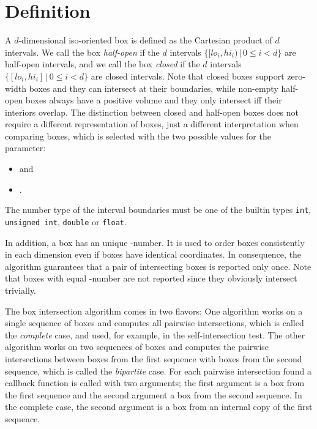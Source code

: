 \section{Definition}\label{sec:box-inters-def}

A $d$-dimensional iso-oriented box is defined as the Cartesian product
of $d$ intervals. We call the box \emph{half-open} if the $d$
intervals $\{ [lo_i,hi_i) \,|\, 0 \leq i < d\}$ are half-open intervals,
and we call the box \emph{closed} if the $d$ intervals $\{ [lo_i,hi_i]
\,|\, 0 \leq i < d\}$ are closed intervals. Note that closed boxes support
zero-width boxes and they can intersect at their boundaries, while
non-empty half-open boxes always have a positive volume and they only
intersect iff their interiors overlap.  The distinction between closed
and half-open boxes does not require a different representation of
boxes, just a different interpretation when comparing boxes, which is
selected with the two possible values for the  parameter:

\begin{itemize}
  \item {} and
  \item {}.
\end{itemize}

The number type of the interval boundaries must be one of the builtin
types \texttt{int}, \texttt{unsigned int}, \texttt{double} or
\texttt{float}.

In addition, a box has an unique -number. It is used to order
boxes consistently in each dimension even if boxes have identical
coordinates. In consequence, the algorithm guarantees that a pair of
intersecting boxes is reported only once. Note that boxes with equal
-number are not reported since they obviously intersect trivially.

The box intersection algorithm comes in two flavors: One algorithm
works on a single sequence of boxes and computes all pairwise
intersections, which is called the \emph{complete\/} case, and used,
for example, in the self-intersection test. The other algorithm works
on two sequences of boxes and computes the pairwise intersections
between boxes from the first sequence with boxes from the second
sequence, which is called the \emph{bipartite\/} case. For each
pairwise intersection found a callback function is called with two
arguments; the first argument is a box from the first sequence and the
second argument a box from the second sequence. In the complete case,
the second argument is a box from an internal copy of the first
sequence.


